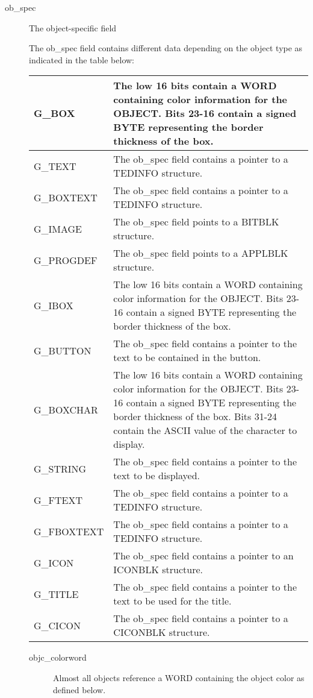 \begin{description}
\item[ob\_spec] The object-specific field

The ob\_spec field contains different data depending on the object type
as indicated in the table below:
\begin{center}\begin{longtable}{|lp{10cm}|}
\hline
G\_BOX &
The low 16 bits contain a WORD containing color information for the OBJECT. 
Bits 23-16 contain a signed BYTE representing the border thickness of the 
box.\\\hline
G\_TEXT &The ob\_spec field contains a pointer to a TEDINFO  structure. \\\hline  
G\_BOXTEXT &The ob\_spec field contains a pointer to a TEDINFO structure.   \\\hline
G\_IMAGE   & The ob\_spec field points to a BITBLK structure. \\\hline
G\_PROGDEF & The ob\_spec field points to a APPLBLK structure.\\\hline
G\_IBOX	  & The low 16 bits contain a WORD containing color information for the OBJECT. 
Bits 23-16 contain a signed BYTE representing the border thickness of the box.\\\hline
G\_BUTTON  & The ob\_spec field contains a pointer to the text to be contained in the button.\\\hline
G\_BOXCHAR & The low 16 bits contain a WORD containing color information for the OBJECT. 
Bits 23-16 contain a signed BYTE representing the border thickness of the box. 
Bits 31-24 contain the ASCII value of the character to display.\\\hline
G\_STRING  & The ob\_spec field contains a pointer to the text to be displayed.\\\hline
G\_FTEXT   & The ob\_spec field contains a pointer to a TEDINFO structure.\\\hline
G\_FBOXTEXT & The ob\_spec field contains a pointer to a TEDINFO structure.\\\hline
G\_ICON & The ob\_spec field contains a pointer to an ICONBLK structure. \\\hline    
G\_TITLE  & The ob\_spec field contains a pointer to the text to be used for the title.\\\hline
G\_CICON  & The ob\_spec field contains a pointer to a CICONBLK structure.\\\hline
\end{longtable}\end{center}

\begin{description}
\item[objc\_colorword]
Almost all objects reference a WORD containing the object color as
defined below.


\end{description}
\end{description}

